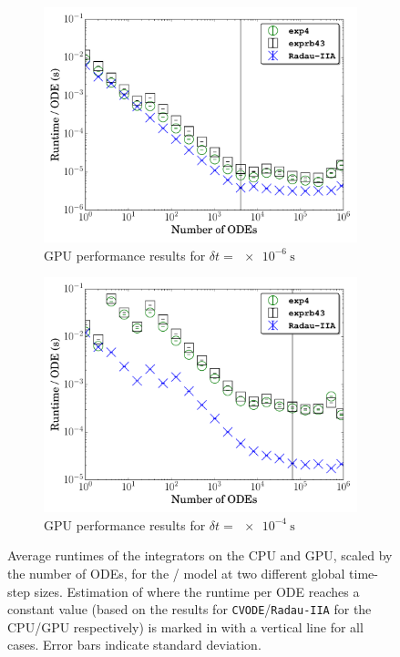 \documentclass[preprint]{elsarticle}
\begin{document}
\begin{figure}[htb]
\begin{subfigure}{0.49\textwidth}
      \includegraphics[width=\linewidth]{H2_1e-06_gpu.pdf}
      \caption{GPU performance results for $\delta t = \SI{e-6}{\second}$}
      \label{F:h2_gpu_perf_small}
  \end{subfigure}
  \begin{subfigure}{0.49\textwidth}
      \includegraphics[width=\linewidth]{H2_1e-04_gpu.pdf}
      \caption{GPU performance results for $\delta t = \SI{e-4}{\second}$}
      \label{F:h2_gpu_perf_large}
  \end{subfigure}
  \caption{Average runtimes of the integrators on the CPU and GPU, scaled by the number of ODEs, for the \slash{} model at two different global time-step sizes.
  Estimation of where the runtime per ODE reaches a constant value (based on the results for \texttt{CVODE}\slash\texttt{Radau-IIA} for the CPU\slash GPU respectively) is marked in with a vertical line for all cases.
  Error bars indicate standard deviation.}
  \label{F:H2_perf}
\end{figure}
\end{document}
